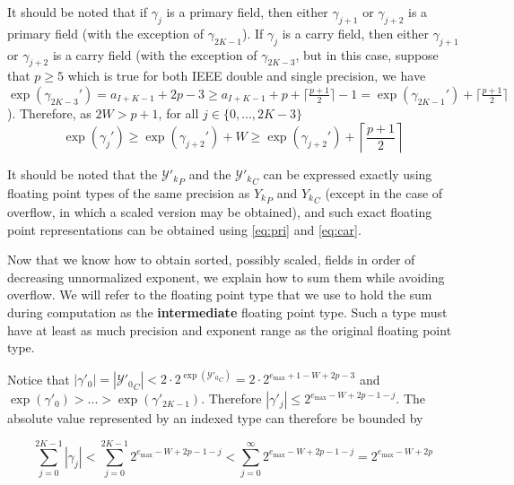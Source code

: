     It should be noted that if $\gamma_j$ is a primary field, then either
    $\gamma_{j + 1}$ or $\gamma_{j + 2}$ is a primary field (with the exception of $\gamma_{2K-1}$).
    If $\gamma_j$ is a
    carry field, then either $\gamma_{j + 1}$ or $\gamma_{j + 2}$ is a carry
    field (with the exception of $\gamma_{2  K - 3}$,
    but in this case, suppose that $p \geq 5$ which is true for both IEEE double and single precision,
    we have
    \(
        \exp(\gamma_{2  K - 3}')
        = a_{I + K - 1} + 2  p - 3 \geq a_{I + K - 1} + p + \lceil\frac{p + 1}{2}\rceil - 1
        = \exp(\gamma_{2  K - 1}') + \lceil\frac{p + 1}{2}\rceil
    \)
    ).
    Therefore, as $2  W > p + 1$, for all $j \in \{0, ..., 2K - 3\}$
    \begin{equation}
      \exp(\gamma_j') \geq \exp(\gamma_{j + 2}') + W \geq \exp(\gamma_{j + 2}') + \left\lceil\frac{p + 1}{2}\right\rceil
      \label{eq:gammadecreasesfast}
    \end{equation}

    It should be noted that the ${\mathcal{Y}'_k}_P$ and the
    ${\mathcal{Y}'_k}_C$ can be expressed exactly using floating point types of
    the same precision as ${Y_k}_P$ and ${Y_k}_C$ (except in the case of
    overflow, in which a scaled version may be obtained), and such exact
    floating point representations can be obtained using  \eqref{eq:pri} and
    \eqref{eq:car}.

    Now that we know how to obtain sorted, possibly scaled, fields in order of
    decreasing unnormalized exponent, we explain how to sum them while avoiding
    overflow. We will refer to the floating point type that we use to hold the
    sum during computation as the \textbf{intermediate} floating point type.
    Such a type must have at least as much precision and exponent range as the
    original floating point type.

    Notice that $|\gamma'_0| = |{\mathcal{Y}'_0}_C| < 2 \cdot 2^{\exp({\mathcal{Y}'_0}_C)} = 2 \cdot 2^{e_{\max} + 1 - W + 2  p - 3}$ and $\exp(\gamma'_0) > ... > \exp(\gamma'_{2  K - 1})$.  Therefore $|\gamma'_j| \leq 2^{e_{\max} - W + 2  p - 1 - j}$. The absolute value represented by an indexed type can therefore be bounded by

    \begin{equation}
      \label{eq:maxindexedvalue}
      \sum\limits_{j = 0}^{2  K - 1} |\gamma_j| < \sum\limits_{j = 0}^{2  K - 1} 2^{e_{\max} - W + 2  p - 1 - j} < \sum\limits_{j = 0}^{\infty} 2^{e_{\max} - W + 2  p - 1 - j} = 2^{e_{\max} - W + 2  p}
    \end{equation}

